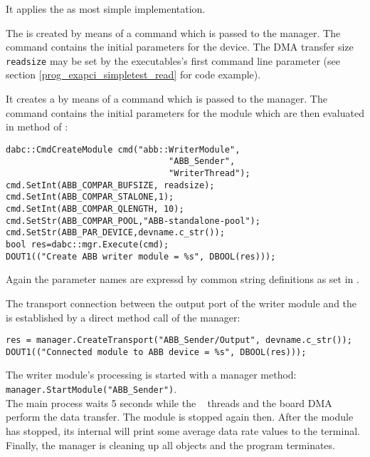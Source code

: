 \begin{compactenum} 

\item It applies the  as most simple
 implementation.

\item The  is created by means of a command
 which is passed to the manager. The 
command contains the initial parameters for the device.
The DMA transfer size {\tt readsize} may be set by
the executables's first command line parameter
(see section \ref{prog_exapci_simpletest_read} for code example).

\item It creates a  by means of a command
 which is passed to the manager. The 
command contains the initial
parameters for the module which are then evaluated in 
method  of :
\begin{small}
\begin{verbatim} 
dabc::CmdCreateModule cmd("abb::WriterModule",
                                "ABB_Sender", 
                                "WriterThread");
cmd.SetInt(ABB_COMPAR_BUFSIZE, readsize);
cmd.SetInt(ABB_COMPAR_STALONE,1);
cmd.SetInt(ABB_COMPAR_QLENGTH, 10);
cmd.SetStr(ABB_COMPAR_POOL,"ABB-standalone-pool");
cmd.SetStr(ABB_PAR_DEVICE,devname.c_str());
bool res=dabc::mgr.Execute(cmd);
DOUT1(("Create ABB writer module = %s", DBOOL(res)));
\end{verbatim} 
\end{small}
Again the parameter names are expressd by 
common string definitions as set in . 

\item The transport connection between the output port of the writer module and
the  is established by a direct method call of the manager:
\begin{small}
\begin{verbatim}
res = manager.CreateTransport("ABB_Sender/Output", devname.c_str());
DOUT1(("Connected module to ABB device = %s", DBOOL(res)));
\end{verbatim}  
\end{small}

\item The writer module's processing 
is started with a manager method: \\
{\tt manager.StartModule("ABB\_Sender")}. \\
The main process waits 5 seconds while the \dabc~ threads
and the board DMA perform the data transfer. The module is stopped
again then. After the module has stopped, its internal 
will print some average data rate values to the terminal.
Finally, the manager is cleaning up all objects
and the program terminates.


\end{compactenum} 

